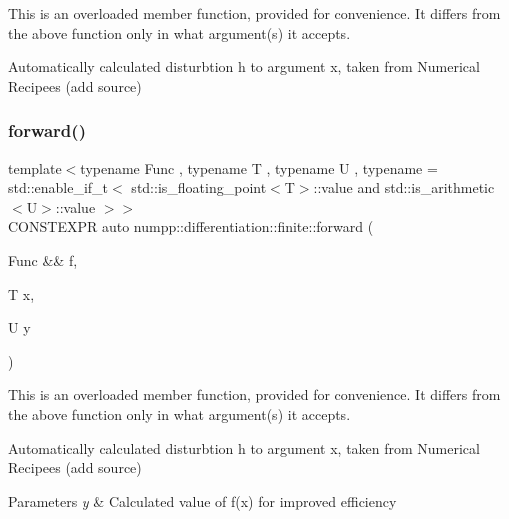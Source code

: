 This is an overloaded member function, provided for convenience. It differs from the above function only in what argument(s) it accepts.

Automatically calculated disturbtion h to argument x, taken from Numerical Recipees (add source)\mbox{\label{group__numpp__differentiation__finite__forward_ga30e4e4b2bacc6da290b47bc94906b404}} 
\subsubsection{\texorpdfstring{forward()}{forward()}\hspace{0.1cm}{\footnotesize\ttfamily [2/3]}}
{\footnotesize\ttfamily template$<$typename Func , typename T , typename U , typename  = std\+::enable\+\_\+if\+\_\+t$<$      std\+::is\+\_\+floating\+\_\+point$<$\+T$>$\+::value and      std\+::is\+\_\+arithmetic$<$\+U$>$\+::value    $>$$>$ \\
C\+O\+N\+S\+T\+E\+X\+PR auto numpp\+::differentiation\+::finite\+::forward (\begin{DoxyParamCaption}\item[{Func \&\&}]{f,  }\item[{T}]{x,  }\item[{U}]{y }\end{DoxyParamCaption})}

This is an overloaded member function, provided for convenience. It differs from the above function only in what argument(s) it accepts.

Automatically calculated disturbtion h to argument x, taken from Numerical Recipees (add source) 
\begin{DoxyParams}{Parameters}
{\em y} & Calculated value of f(x) for improved efficiency\\
\hline
\end{DoxyParams}
\mbox{\label{group__numpp__differentiation__finite__forward_ga8388c3abacb4e48777bb284330f24490}} 
